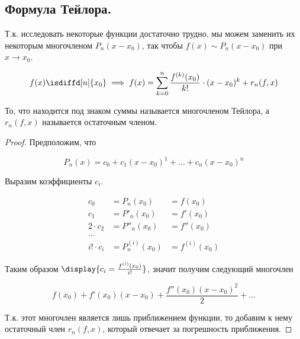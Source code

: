 \subsection{%
  Формула Тейлора.%
}

Т.к. исследовать некоторые функции достаточно трудно, мы можем заменить их
некоторым многочленом \(P_n(x - x_0)\), так чтобы \(f(x) \sim P_n(x - x_0)\) при
\(x \to x_0\).

\begin{theorem}
  \begin{equation*}
    f(x) \isdiffd[n]{x_0}
    \implies
    f(x) = \sum_{k = 0}^n \frac{f^{(k)}(x_0)}{k!} \cdot (x - x_0)^k + r_n(f, x)
  \end{equation*}

  То, что находится под знаком суммы называется многочленом Тейлора, а \(r_n(f,
  x)\) называется остаточным членом.
\end{theorem}

\begin{proof}
  Предположим, что

  \begin{equation*}
    P_n(x) = c_0 + c_1 (x - x_0)^1 + \dotsc + c_n (x - x_0)^n
  \end{equation*}

  Выразим коэффициенты \(c_i\).

  \begin{equation*}
    \begin{aligned}
      c_0          & = P_n(x_0)       & = f(x_0)
    \\
      c_1          & = P'_n(x_0)      & = f'(x_0)
    \\
      2 \cdot c_2  & = P''_n(x_0)     & = f''(x_0)
    \\
      \dotsc
    \\
      i! \cdot c_i & = P^{(i)}_n(x_0) & = f^{(i)}(x_0)
    \end{aligned}
  \end{equation*}

  Таким образом \(\display{c_i = \frac{f^{(i)}(x_0)}{i!}}\), значит получим
  следующий многочлен

  \begin{equation*}
    f(x_0) + f'(x_0)(x - x_0) + \frac{f''(x_0)(x - x_0)^2}{2} + \dotsc
  \end{equation*}

  Т.к. этот многочлен является лишь приближением функции, то добавим к нему
  остаточный член \(r_n(f, x)\), который отвечает за погрешность приближения.
\end{proof}

